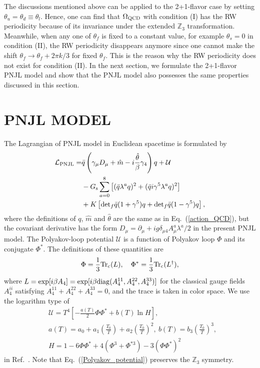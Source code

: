 \documentclass[prd,superscriptaddress,unsortedaddress,
twocolumn,showpacs,preprintnumbers,amsmath,amssymb]{revtex4}
\begin{document}
The discussions mentioned above can be applied
to the 2+1-flavor case by setting $\theta_{u}=\theta_{d}\equiv \theta_{l}$.
Hence, one can find that $\Omega_{\rm QCD}$ with condition (I)
has the RW periodicity because of its invariance under the
extended $\mathbb{Z}_{3}$ transformation.
Meanwhile, when any one of $\theta_{f}$ is fixed to a constant value,
for example $\theta_{s}=0$ in condition (II),
the RW periodicity disappears anymore since
one cannot make the shift
$\theta_{f}\rightarrow \theta_{f}+2\pi k/3$ for fixed $\theta_{f}$.
This is the reason why
the RW periodicity does not exist for condition (II).
In the next section, we formulate the 2+1-flavor PNJL model and
show that the PNJL model also possesses the same properties
discussed in this section.


\section{PNJL MODEL}
\label{Sec_3}
The Lagrangian of PNJL model in Euclidean spacetime
is formulated by
\begin{align}
 \mathcal{L}_{\rm PNJL}=
 &\bar{q}\left(\gamma_{\mu}D_{\mu}+\hat{m}-i\frac{\hat{\theta}}{\beta}\gamma_{4}\right)q
 +\mathcal{U}
 \notag \\
 &-G_{\rm s}\sum_{a=0}^{8}
 \left[
 (\bar{q}\lambda^a q)^2+(\bar{q}i\gamma^5\lambda^a q)^2
 \right]
 \notag \\
 &+K\left[\textrm{det}_{f}\bar{q}(1+\gamma^5)q
 +\textrm{det}_{f}\bar{q}(1-\gamma^5)q\right],
 \label{Lag_PNJL}
\end{align}
where the definitions of $q$, $\hat{m}$ and $\hat{\theta}$
are the same as in Eq.~(\ref{action_QCD}),
but the covariant derivative has the form
$D_{\mu}=\partial_{\mu}+ig\delta_{\mu 4}A^{a}_{\mu}\lambda^a/2$
in the present PNJL model.
The Polyakov-loop potential $\mathcal{U}$ is a
function of Polyakov loop $\Phi$ and its conjugate $\Phi^{\ast}$.
The definitions of these quantities are
\begin{align}
 \Phi = \frac{1}{3}{\rm Tr}_{\rm c}(L),\ \ \
 \Phi^{\ast} = \frac{1}{3}{\rm Tr}_{\rm c}({L}^{\dag}),
\end{align}
where $L= \exp[i\beta A_4]=\exp[i\beta{\rm diag}(A_4^{11},A_4^{22},A_4^{33})]$
for the classical gauge fields $A_4^{ii}$ satisfying $A_4^{11}+A_4^{22}+A_4^{33}=0$,
and the trace is taken in color space.
We use the logarithm type of
\begin{align}
 &\mathcal{U}
 =T^4\left[-\frac{a(T)}{2}\Phi\Phi^{\ast}+b(T)\ln H\right],
 \label{Polyakov_potential}
 \\
 &a(T)=a_{0}+a_{1}\left(\frac{T_{0}}{T}\right)+a_{2}\left(\frac{T_{0}}{T}\right)^2,
 \ b(T)=b_{3}\left(\frac{T_{0}}{T}\right)^3,
 \\
 &H=1-6\Phi\Phi^{\ast}+4(\Phi^3+\Phi^{\ast 3})-3(\Phi\Phi^{\ast})^2
 \label{Haar_measure}
\end{align}
in Ref.~\cite{Rossner}. Note that Eq.~(\ref{Polyakov_potential}) preserves the $\mathbb{Z}_{3}$
symmetry.
\end{document}
